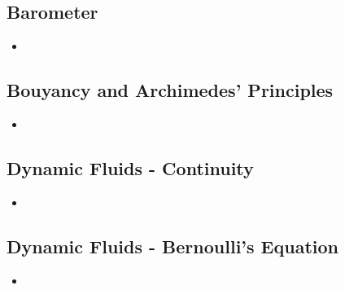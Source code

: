 \subsection{Barometer}
\begin{itemize}
    \item 
\end{itemize}

\subsection{Bouyancy and Archimedes' Principles}
\begin{itemize}
    \item 
\end{itemize}

\subsection{Dynamic Fluids - Continuity}
\begin{itemize}
    \item 
\end{itemize}

\subsection{Dynamic Fluids - Bernoulli's Equation}
\begin{itemize}
    \item 
\end{itemize}

